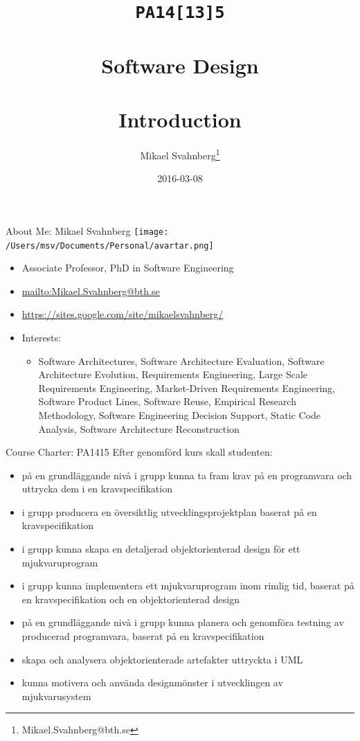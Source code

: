 \documentclass[10pt,t,a4paper]{beamer}
\author{Mikael Svahnberg\thanks{Mikael.Svahnberg@bth.se}}
\date{2016-03-08}
\title{\texttt{PA14[13]5} \\\\Software Design\\\\Introduction}
\begin{document}
\maketitle

\begin{frame}[label=sec-1]{About Me: Mikael Svahnberg}
\texttt{[image: /Users/msv/Documents/Personal/avartar.png]}
\begin{itemize}
\item Associate Professor, PhD in Software Engineering
\item \url{mailto:Mikael.Svahnberg@bth.se}
\item \url{https://sites.google.com/site/mikaelsvahnberg/}
\item Interests:
\begin{itemize}
\item Software Architectures, Software Architecture Evaluation, Software Architecture Evolution, Requirements Engineering, Large Scale Requirements Engineering, Market-Driven Requirements Engineering, Software Product Lines, Software Reuse, Empirical Research Methodology, Software Engineering Decision Support, Static Code Analysis, Software Architecture Reconstruction
\end{itemize}
\end{itemize}
\end{frame}
\begin{frame}[label=sec-2]{Course Charter: PA1415}
Efter genomförd kurs skall studenten:
\begin{itemize}
\item på en grundläggande nivå i grupp kunna ta fram krav på en programvara och uttrycka dem i en kravspecifikation
\item i grupp producera en översiktlig utvecklingsprojektplan baserat på en kravspecifikation
\item i grupp kunna skapa en detaljerad objektorienterad design för ett mjukvaruprogram
\item i grupp kunna implementera ett mjukvaruprogram inom rimlig tid, baserat på en kravspecifikation och en objektorienterad design
\item på en grundläggande nivå i grupp kunna planera och genomföra testning av producerad programvara, baserat på en kravspecifikation
\item skapa och analysera objektorienterade artefakter uttryckta i UML
\item kunna motivera och använda designmönster i utvecklingen av mjukvarusystem
\end{itemize}
\end{frame}
\end{document}
